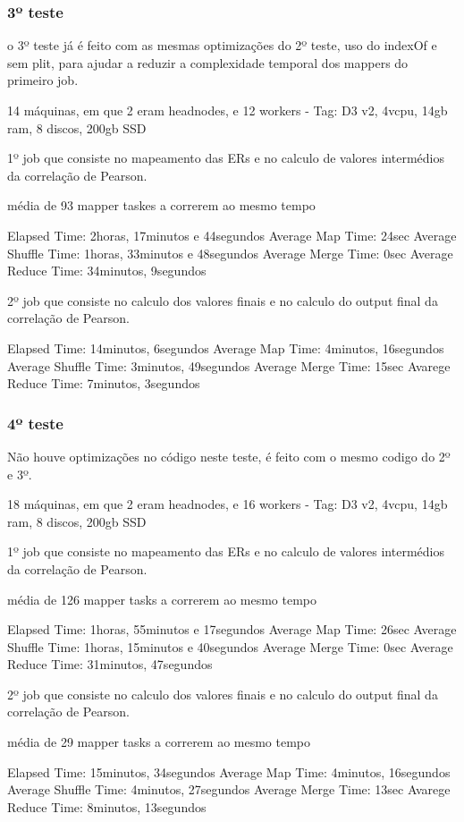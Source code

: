     

\subsubsection{3º teste}
o 3º teste já é feito com as mesmas optimizações do 2º teste, uso do indexOf e sem plit, para ajudar a reduzir a complexidade temporal dos mappers do primeiro job.

14 máquinas, em que 2 eram headnodes, e 12 workers - Tag: D3 v2, 4vcpu, 14gb ram, 8 discos, 200gb SSD

1º job que consiste no mapeamento das ERs e no calculo de valores intermédios da correlação de Pearson.

média de 93 mapper taskes a correrem ao mesmo tempo

Elapsed Time: 2horas, 17minutos e 44segundos
Average Map Time: 24sec
Average Shuffle Time: 1horas, 33minutos e 48segundos
Average Merge Time: 0sec
Average Reduce Time: 34minutos, 9segundos


2º job que consiste no calculo dos valores finais e no calculo do output final da correlação de Pearson.

Elapsed Time: 14minutos, 6segundos
Average Map Time: 4minutos, 16segundos
Average Shuffle Time: 3minutos, 49segundos
Average Merge Time: 15sec
Avarege Reduce Time: 7minutos, 3segundos

\subsubsection{4º teste}
Não houve optimizações no código neste teste, é feito com o mesmo codigo do 2º e 3º.

18 máquinas, em que 2 eram headnodes, e 16 workers - Tag: D3 v2, 4vcpu, 14gb ram, 8 discos, 200gb SSD

1º job que consiste no mapeamento das ERs e no calculo de valores intermédios da correlação de Pearson.

média de 126 mapper tasks a correrem ao mesmo tempo

Elapsed Time: 1horas, 55minutos e 17segundos
Average Map Time: 26sec
Average Shuffle Time: 1horas, 15minutos e 40segundos
Average Merge Time: 0sec
Average Reduce Time: 31minutos, 47segundos

2º job que consiste no calculo dos valores finais e no calculo do output final da correlação de Pearson.

média de 29 mapper tasks a correrem ao mesmo tempo 

Elapsed Time: 15minutos, 34segundos
Average Map Time: 4minutos, 16segundos
Average Shuffle Time: 4minutos, 27segundos
Average Merge Time: 13sec
Avarege Reduce Time: 8minutos, 13segundos


